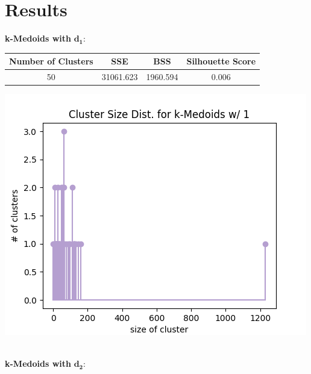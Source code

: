 \documentclass[fleqn]{article}
\begin{document}
\section{Results}
\textbf{k-Medoids with }$\mathbf{d_1}$:\\
\begin{minipage}{0.65\textwidth}
    \begin{tabular}{|c|c|c|c|}
        \hline
        \textbf{Number of Clusters} & \textbf{SSE} &\textbf{BSS} &\textbf{Silhouette Score}\\
        \hline
        50 & 31061.623 & 1960.594 & 0.006\\
        \hline
    \end{tabular}
\end{minipage}\begin{minipage}{0.35\textwidth}
    \includegraphics[scale=0.35]{images/size_dist_km_d1.png}
\end{minipage}\\
\textbf{k-Medoids with }$\mathbf{d_2}$:\\
\end{document}
